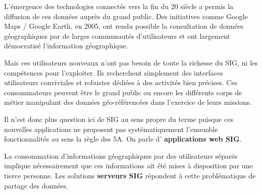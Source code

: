 \documentclass[11pt]{article}
\begin{document}
L'émergence des technologies connectés vers la fin du 20 siècle a permis la diffusion de ces données auprès du grand public. Des initiatives comme Google Maps / Google Earth, en 2005, ont rendu possible la consultation de données géographiques par de larges communautés d'utilisateurs et ont largement démocratisé l'information géographique. 

Mais ces utilisateurs nouveaux n’ont pas besoin de toute la richesse du SIG, ni les compétences pour l'exploiter. Ils recherchent simplement des interfaces utilisateurs conviviales et robustes dédiées à des activités bien précises. Ces consommateurs peuvent être le grand public ou encore les différents corps de métier manipulant des données géo-référencées dans l’exercice de leurs missions. 

Il n'est donc plus question ici de SIG au sens propre du terme puisque ces nouvelles applications ne proposent pas systématiquement l'ensemble fonctionnalités au sens la règle des 5A. On parle d' \textbf{applications web SIG}.

La consommation d'informations géographiques par des utilisateurs séparés implique nécessairement que ces informations ait été mises à disposition par une tierce personne. Les solutions \textbf{serveurs SIG} répondent à cette problématique de partage des données. 

\begin{center}
\end{center}
\end{document}
